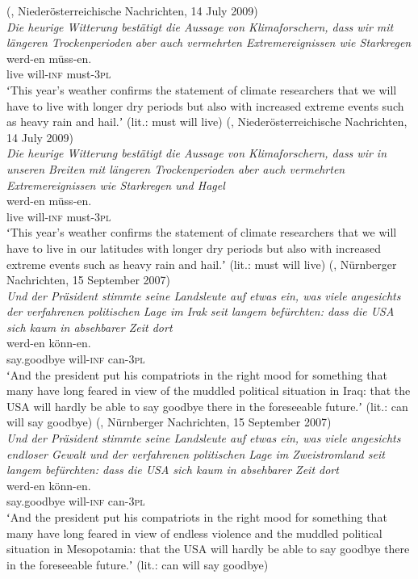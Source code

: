 \documentclass[output=paper,hidelinks]{langscibook}
\begin{document}
\begin{enumerate}[label=(\roman*)]
\ea\label{ex:reiner:25}  (, Niederösterreichische Nachrichten, 14 July 2009) \\
\emph{Die heurige Witterung bestätigt die Aussage von Klimaforschern, dass wir mit längeren Trockenperioden aber auch vermehrten Extremereignissen wie Starkregen}\\
	{werd-en}	{müss-en.}\\
live	will-\textsc{inf}	must-\textsc{3pl}\\
\glt ʻThis year’s weather confirms the statement of climate researchers that we will have to live with longer dry periods but also with increased extreme events such as heavy rain and hail.ʼ (lit.: must will live)
\ex\label{ex:reiner:26}  (, Niederösterreichische Nachrichten, 14 July 2009) \\
\emph{Die heurige Witterung bestätigt die Aussage von Klimaforschern, dass wir in unseren Breiten mit längeren Trockenperioden aber auch vermehrten Extremereignissen wie Starkregen und Hagel}\\
	{werd-en}	{müss-en.}\\
live	will-\textsc{inf}	must-\textsc{3pl}\\
\glt ʻThis year’s weather confirms the statement of climate researchers that we will have to live in our latitudes with longer dry periods but also with increased extreme events such as heavy rain and hail.ʼ (lit.: must will live)
\ex\label{ex:reiner:27} 	 (, Nürnberger Nachrichten, 15 September 2007) \\
\emph{Und der Präsident stimmte seine Landsleute auf etwas ein, was viele angesichts der verfahrenen politischen Lage im Irak seit langem befürchten: dass die USA sich kaum in absehbarer Zeit dort}\\
		{werd-en}	{könn-en.}\\
 say.goodbye		will-\textsc{inf}	can-\textsc{3pl}\\
\glt ʻAnd the president put his compatriots in the right mood for something that many have long feared in view of the muddled political situation in Iraq: that the USA will hardly be able to say goodbye there in the foreseeable future.ʼ (lit.: can will say goodbye)
\ex\label{ex:reiner:28} 	 (, Nürnberger Nachrichten, 15 September 2007) \\
\emph{Und der Präsident stimmte seine Landsleute auf etwas ein, was viele angesichts endloser Gewalt und der verfahrenen politischen Lage im Zweistromland seit langem befürchten: dass die USA sich kaum in absehbarer Zeit dort}\\
		{werd-en}	{könn-en.}\\
say.goodbye		will-\textsc{inf}	can-\textsc{3pl}\\
\glt ʻAnd the president put his compatriots in the right mood for something that many have long feared in view of endless violence and the muddled political situation in Mesopotamia: that the USA will hardly be able to say goodbye there in the foreseeable future.ʼ (lit.: can will say goodbye)
\z 


\end{enumerate}
\end{document}
